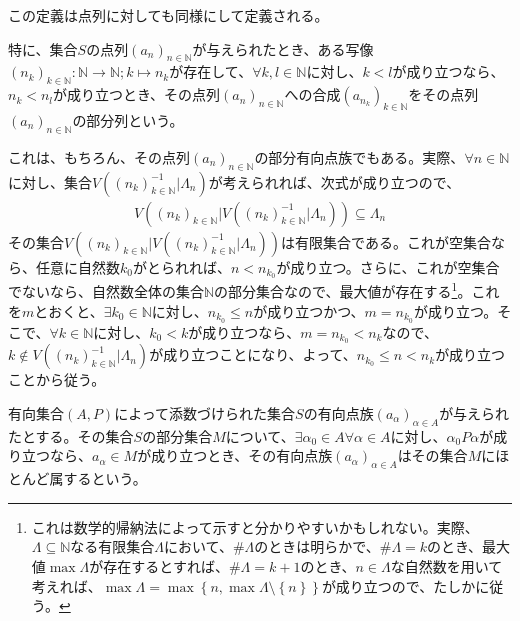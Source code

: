 \documentclass[dvipdfmx]{jsarticle}
\begin{document}
この定義は点列に対しても同様にして定義される。
\begin{dfn}\label{部分列}
特に、集合$S$の点列$\left( a_{n} \right)_{n \in \mathbb{N}}$が与えられたとき、ある写像$\left( n_{k} \right)_{k \in \mathbb{N}}:\mathbb{N} \rightarrow \mathbb{N};k \mapsto n_{k}$が存在して、$\forall k,l \in \mathbb{N}$に対し、$k < l$が成り立つなら、$n_{k} < n_{l}$が成り立つとき、その点列$\left( a_{n} \right)_{n \in \mathbb{N}}$への合成$\left( a_{n_{k}} \right)_{k \in \mathbb{N}}$をその点列$\left( a_{n} \right)_{n \in \mathbb{N}}$の部分列という。
\end{dfn}\par
これは、もちろん、その点列$\left( a_{n} \right)_{n \in \mathbb{N}}$の部分有向点族でもある。実際、$\forall n \in \mathbb{N}$に対し、集合$V\left( \left( n_{k} \right)_{k \in \mathbb{N}}^{- 1}|\varLambda_{n} \right)$が考えられれば、次式が成り立つので、
\begin{align*}
V\left( \left( n_{k} \right)_{k \in \mathbb{N}}|V\left( \left( n_{k} \right)_{k \in \mathbb{N}}^{- 1}|\varLambda_{n} \right) \right) \subseteq \varLambda_{n}
\end{align*}
その集合$V\left( \left( n_{k} \right)_{k \in \mathbb{N}}|V\left( \left( n_{k} \right)_{k \in \mathbb{N}}^{- 1}|\varLambda_{n} \right) \right)$は有限集合である。これが空集合なら、任意に自然数$k_{0}$がとられれば、$n < n_{k_{0}}$が成り立つ。さらに、これが空集合でないなら、自然数全体の集合$\mathbb{N}$の部分集合なので、最大値が存在する\footnote{これは数学的帰納法によって示すと分かりやすいかもしれない。実際、$\varLambda \subseteq \mathbb{N}$なる有限集合$\varLambda$において、${\#}\varLambda$のときは明らかで、${\#}\varLambda = k$のとき、最大値$\max\varLambda$が存在するとすれば、${\#}\varLambda = k + 1$のとき、$n \in \varLambda$な自然数を用いて考えれば、$\max\varLambda = \max\left\{ n,\max{\varLambda \setminus \left\{ n \right\}} \right\}$が成り立つので、たしかに従う。}。これを$m$とおくと、$\exists k_{0} \in \mathbb{N}$に対し、$n_{k_{0}} \leq n$が成り立つかつ、$m = n_{k_{0}}$が成り立つ。そこで、$\forall k \in \mathbb{N}$に対し、$k_{0} < k$が成り立つなら、$m = n_{k_{0}} < n_{k}$なので、$k \notin V\left( \left( n_{k} \right)_{k \in \mathbb{N}}^{- 1}|\varLambda_{n} \right)$が成り立つことになり、よって、$n_{k_{0}} \leq n < n_{k}$が成り立つことから従う。
\begin{dfn}
有向集合$(A,P)$によって添数づけられた集合$S$の有向点族$\left( a_{\alpha} \right)_{\alpha \in A}$が与えられたとする。その集合$S$の部分集合$M$について、$\exists\alpha_{0} \in A\forall\alpha \in A$に対し、$\alpha_{0}P\alpha$が成り立つなら、$a_{\alpha} \in M$が成り立つとき、その有向点族$\left( a_{\alpha} \right)_{\alpha \in A}$はその集合$M$にほとんど属するという。
\end{dfn}
\end{document}
